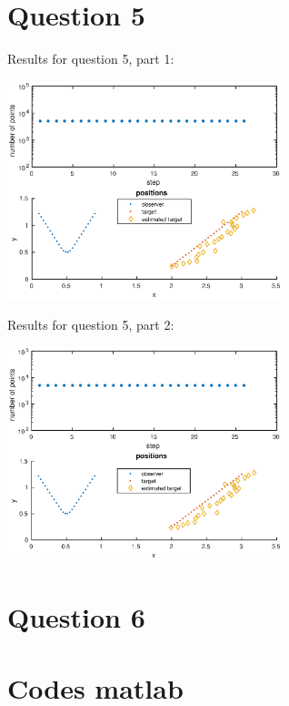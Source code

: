 \documentclass[english,DIV=13]{scrartcl}
\begin{document}
\section*{Question 5}

Results for question 5, part 1:
\begin{center}
   \includegraphics[width=0.6\textwidth]{img/q51.eps}
\end{center}

Results for question 5, part 2:
\begin{center}
   \includegraphics[width=0.6\textwidth]{img/q52.eps}
\end{center}

\section*{Question 6}


\section*{Codes matlab}

\end{document}
